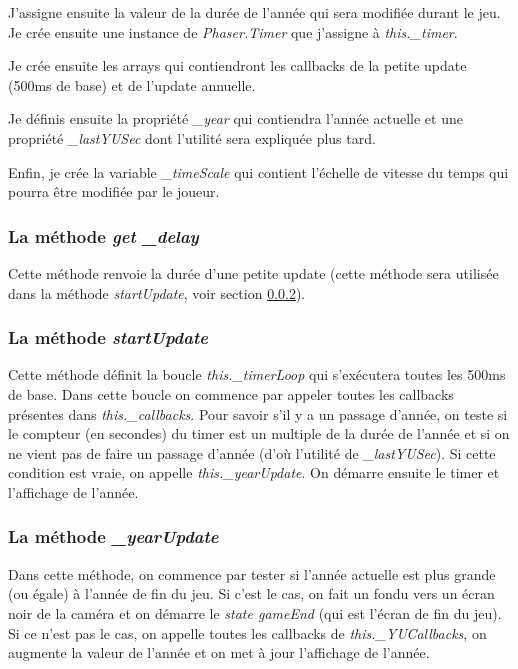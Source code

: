 \documentclass{article}
\begin{document}
		
		J'assigne ensuite la valeur de la durée de l'année qui sera modifiée durant le jeu. Je crée ensuite une instance de \textit{Phaser.Timer} que j'assigne à \textit{this.\_timer}.
		
		Je crée ensuite les arrays qui contiendront les callbacks de la petite update (500ms de base) et de l'update annuelle. 
		
		
		Je définis ensuite la propriété \textit{\_year} qui contiendra l'année actuelle et une propriété \textit{\_lastYUSec} dont l'utilité sera expliquée plus tard.
		
		
		Enfin, je crée la variable \textit{\_timeScale} qui contient l'échelle de vitesse du temps qui pourra être modifiée par le joueur.
		
		\subsubsection{La méthode \textit{get \_delay}}
		Cette méthode renvoie la durée d'une petite update (cette méthode sera utilisée dans la méthode \textit{startUpdate}, voir section \ref{startUpdate}).
		
		\subsubsection{La méthode \textit{startUpdate}} \label{startUpdate}
		Cette méthode définit la boucle \textit{this.\_timerLoop} qui s'exécutera toutes les 500ms de base. Dans cette boucle on commence par appeler toutes les callbacks présentes dans \textit{this.\_callbacks}. 
		Pour savoir s'il y a un passage d'année, on teste si le compteur (en secondes) du timer est un multiple de la durée de l'année et si on ne vient pas de faire un passage d'année (d'où l'utilité de \textit{\_lastYUSec}). Si cette condition est vraie, on appelle \textit{this.\_yearUpdate}.
		On démarre ensuite le timer et l'affichage de l'année.
		
		\subsubsection{La méthode \textit{\_yearUpdate}}
		Dans cette méthode,  on commence par tester si l'année actuelle est plus grande (ou égale) à l'année de fin du jeu. Si c'est le cas, on fait un fondu vers un écran noir de la caméra et on démarre le \textit{state gameEnd} (qui est l'écran de fin du jeu).
		Si ce n'est pas le cas, on appelle toutes les callbacks de \textit{this.\_YUCallbacks}, on augmente la valeur de l'année et on met à jour l'affichage de l'année.
		
\end{document}
